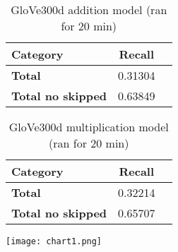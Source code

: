 \begin{center}
    \begin{table}[h!]
        \begin{tabular}{| l | c | r}
        	\hline
        	\textbf{Category} &    \textbf{Recall}\\ \hline
        	\textbf{Total}				& 0.31304 \\
        	\textbf{Total no skipped}	& 0.63849 \\ \hline
        \end{tabular}
    \caption{GloVe300d addition model (ran for 20 min)}
    \label{table:glove300d_addition}
    \end{table}
    
    \begin{table}[h!]
        \begin{tabular}{| l | c | r}
        	\hline
        	\textbf{Category} &    \textbf{Recall}\\ \hline
        	\textbf{Total}				& 0.32214 \\
        	\textbf{Total no skipped}	& 0.65707 \\ \hline
        \end{tabular}
    \caption{GloVe300d multiplication model (ran for 20 min)}
    \label{table:glove300d_multiplication}
    \end{table}
\end{center}

\texttt{[image: chart1.png]}
